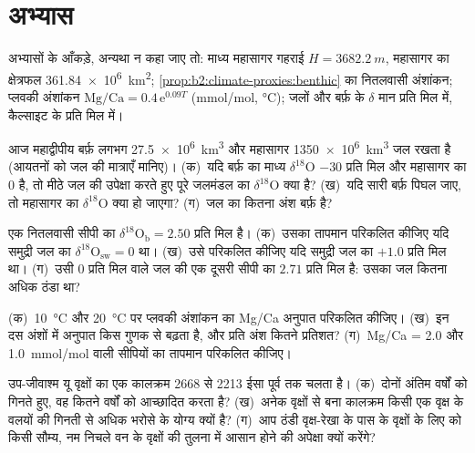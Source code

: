 \section*{अभ्यास}\label{sec:b2:climate-proxies:exercises}

अभ्यासों के आँकड़े, अन्यथा न कहा जाए तो: माध्य महासागर गहराई $H = \qty{3682.2}{m}$, महासागर का
क्षेत्रफल \qty{361.84e6}{km^2}; \cref{prop:b2:climate-proxies:benthic} का नितलवासी अंशांकन;
प्लवकी अंशांकन $\text{Mg/Ca} = 0.4\,\mathrm{e}^{0.09T}$ (\unit{mmol/mol}, \unit{\celsius});
जलों और बर्फ़ के $\delta$ मान प्रति मिल  में, कैल्साइट के प्रति मिल  में।

\begin{exercise}[$\star$]\label{exo:b2:climate-proxies:1}
आज महाद्वीपीय बर्फ़ लगभग \qty{27.5e6}{km^3} और महासागर \qty{1350e6}{km^3} जल
रखता है (आयतनों को जल की मात्राएँ मानिए)। (क)~यदि बर्फ़ का माध्य $\delta^{18}$O $-30$ प्रति
मिल और महासागर का 0 है, तो मीठे जल की उपेक्षा करते हुए पूरे जलमंडल का $\delta^{18}$O क्या है?
(ख)~यदि सारी बर्फ़ पिघल जाए, तो महासागर का $\delta^{18}$O क्या हो जाएगा? (ग)~जल का कितना
अंश बर्फ़ है?
\end{exercise}

\begin{exercise}[$\star$]\label{exo:b2:climate-proxies:2}
एक नितलवासी सीपी का $\delta^{18}\mathrm{O}_{\mathrm{b}} = 2.50$ प्रति मिल है। (क)~उसका
तापमान परिकलित कीजिए यदि समुद्री जल का $\delta^{18}\mathrm{O}_{\mathrm{sw}} = 0$ था। (ख)~उसे परिकलित कीजिए यदि
समुद्री जल का $+1.0$ प्रति मिल था। (ग)~उसी $0$ प्रति मिल वाले जल की एक दूसरी सीपी का
$2.71$ प्रति मिल है: उसका जल कितना अधिक ठंडा था?
\end{exercise}

\begin{exercise}[$\star$]\label{exo:b2:climate-proxies:3}
(क)~\qty{10}{\celsius} और
\qty{20}{\celsius} पर प्लवकी अंशांकन का Mg/Ca अनुपात परिकलित कीजिए। (ख)~इन दस अंशों में अनुपात किस गुणक से बढ़ता है, और प्रति अंश
कितने प्रतिशत? (ग)~Mg/Ca = 2.0 और
\qty{1.0}{mmol/mol} वाली सीपियों का तापमान परिकलित कीजिए।
\end{exercise}

\begin{exercise}[$\star$]\label{exo:b2:climate-proxies:4}
उप-जीवाश्म यू वृक्षों का एक कालक्रम 2668 से 2213 ईसा पूर्व तक चलता है। (क)~दोनों अंतिम वर्षों को गिनते हुए,
वह कितने वर्षों को आच्छादित करता है? (ख)~अनेक वृक्षों से बना कालक्रम किसी एक वृक्ष के वलयों की गिनती से
अधिक भरोसे के योग्य क्यों है? (ग)~आप ठंडी वृक्ष-रेखा के पास के वृक्षों के लिए  को किसी सौम्य, नम
निचले वन के वृक्षों की तुलना में आसान होने की अपेक्षा क्यों करेंगे?
\end{exercise}

